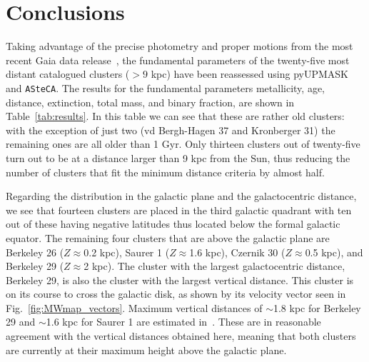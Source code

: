 \documentclass[draft]{aa}
\begin{document}
\section{Conclusions}
 \label{sec:conclusions}

  Taking advantage of the precise photometry and proper motions from the
  most recent Gaia data release~\citep{Gaia_EDR3}, the fundamental parameters
  of the twenty-five most distant catalogued clusters ($>9$ kpc) have been
  reassessed using pyUPMASK and \texttt{ASteCA}.
  The results for the fundamental parameters metallicity, age, distance,
  extinction, total mass, and binary fraction, are shown in 
  Table~\ref{tab:results}. In this table we can see that these are
  rather old clusters: with the exception of just two (vd Bergh-Hagen 37 and
  Kronberger 31) the remaining ones are all older than 1 Gyr.
  Only thirteen clusters out of twenty-five turn out to be at a distance larger
  than 9 kpc from the Sun, thus reducing the number of clusters that fit the
  minimum distance criteria by almost half.

  Regarding the distribution in the galactic plane and the galactocentric
  distance, we see that fourteen clusters are placed in the third galactic
  quadrant with ten out of these having negative latitudes thus located below
  the formal galactic equator. The remaining four clusters that are above the
  galactic plane are Berkeley 26 ($Z\approx$0.2 kpc), Saurer 1
  ($Z\approx$1.6 kpc), Czernik 30 ($Z\approx$0.5 kpc), and Berkeley
  29 ($Z\approx$2 kpc). The cluster with the largest galactocentric distance,
  Berkeley 29, is also the cluster with the largest vertical distance. This
  cluster is on its course to cross the galactic disk, as shown by its velocity
  vector seen in Fig.~\ref{fig:MWmap_vectors}. Maximum vertical distances
  of $\sim$1.8 kpc for Berkeley 29 and $\sim$1.6 kpc for Saurer 1 are estimated
  in~\cite{Gaia_Collaboration_2021}. These are in reasonable agreement with the
  vertical distances obtained here, meaning that both clusters are currently at
  their maximum height above the galactic plane.
\end{document}
